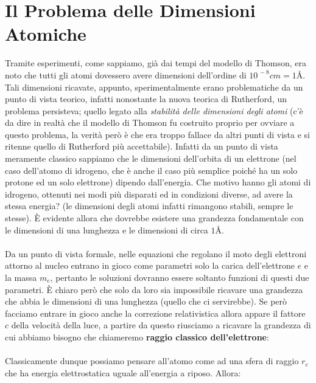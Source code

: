 \section{Il Problema delle Dimensioni Atomiche}
 	
	Tramite esperimenti, come sappiamo, già dai tempi del modello di Thomson, era noto che tutti gli atomi dovessero avere dimensioni dell'ordine di $10^{\, -8} cm = 1Å$. Tali dimensioni ricavate, appunto, sperimentalmente erano problematiche da un punto di vista teorico, infatti nonostante la nuova teorica di Rutherford, un problema persisteva; quello legato alla \textit{stabilità delle dimensioni degli atomi} (c'è da dire in realtà che il modello di Thomson fu costruito proprio per ovviare a questo problema, la verità però è che era troppo fallace da altri punti di vista e si ritenne quello di Rutherford più accettabile).  Infatti da un punto di vista meramente classico sappiamo che le dimensioni dell'orbita di un elettrone (nel caso dell'atomo di idrogeno, che è anche il caso più semplice poiché ha un solo protone ed un solo elettrone) dipendo dall'energia. Che motivo hanno gli atomi di idrogeno, ottenuti nei modi più disparati ed in condizioni diverse, ad avere la stessa energia? (le dimensioni degli atomi infatti rimangono stabili, sempre le stesse). È evidente allora che dovrebbe esistere una grandezza fondamentale con le dimensioni di una lunghezza e le dimensioni di circa $1Å$.
	\\
	\\
	 Da un punto di vista formale, nelle equazioni che regolano il moto degli elettroni attorno al nucleo entrano in gioco come parametri solo la carica dell'elettrone $e$ e la massa $m_e$, pertanto le soluzioni dovranno essere soltanto funzioni di questi due parametri. È chiaro però che solo da loro sia impossibile ricavare una grandezza che abbia le dimensioni di una lunghezza (quello che ci servirebbe). Se però facciamo entrare in gioco anche la correzione relativistica allora appare il fattore $c$ della velocità della luce, a partire da questo riusciamo a ricavare la grandezza di cui abbiamo bisogno che chiameremo \textbf{raggio classico dell'elettrone}:
	 \\
	 \\
	  Classicamente dunque possiamo pensare all'atomo come ad una sfera di raggio $r_e$ che ha energia elettrostatica uguale all'energia a riposo. Allora:
	
